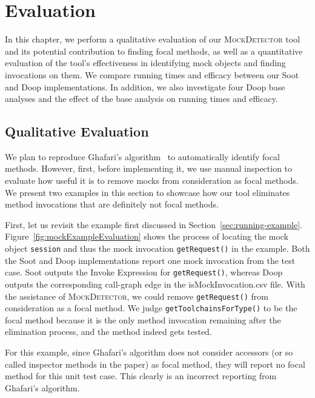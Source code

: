 \chapter{Evaluation}
\label{chap:evaluation}	

In this chapter, we perform a qualitative evaluation of our \textsc{MockDetector} tool and its potential contribution to finding focal methods, as well as a quantitative evaluation of the tool's effectiveness in identifying mock objects and finding invocations on them. We compare running times and efficacy between our Soot and Doop implementations. In addition, we also investigate four Doop base analyses and the effect of the base analysis on running times and efficacy.

\section{Qualitative Evaluation}

We plan to reproduce Ghafari's algorithm~\cite{ghafari15:_autom} to automatically identify focal methods. However, first, before implementing it, we use manual inspection to evaluate how useful it is to remove mocks from consideration as focal methods. We present two examples in this section to showcase how our tool eliminates method invocations that are definitely not focal methods.

First, let us revisit the example first discussed in Section~\ref{sec:running-example}. Figure~\ref{fig:mockExampleEvaluation} shows the process of locating the mock object \texttt{session} and thus the mock invocation \texttt{getRequest()} in the example. Both the Soot and Doop implementations report one mock invocation from the test case. Soot outputs the Invoke Expression for \texttt{getRequest()}, whereas Doop outputs the corresponding call-graph edge in the isMockInvocation.csv file. With the assistance of \textsc{MockDetector}, we could remove \texttt{getRequest()} from consideration as a focal method. We judge \texttt{getToolchainsForType()} to be the focal method because it is the only method invocation remaining after the elimination process, and the method indeed gets tested.

For this example, since Ghafari's algorithm does not consider accessors (or so called inspector methods in the paper) as focal method, they will report no focal method for this unit test case. This clearly is an incorrect reporting from Ghafari's algorithm.

